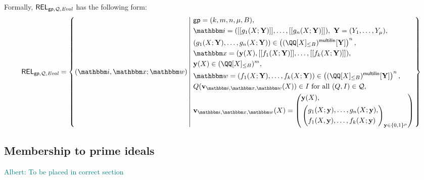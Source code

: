 \documentclass[11pt,letterpaper,usenames,dvipsnames]{article}
\newcommand{\albert}[1]{\textcolor{teal}{Albert: {#1}}}
\begin{document}
    Formally, $\mathsf{REL}_{\mathsf{gp},\mathcal{Q},\text{\emph{Eval}}}$ has the following form:
    \begin{equation*}
    \begin{aligned}
    \REL_{\gparams,\cQ,\evalconstraints} = \left\{ (\idx, \inp ; \wit) \left| \ \begin{aligned}
    & \gparams=(k,m,n,\mu, B),  \\
    & \idx = ( \oracle{g_1(X;\YY)},\ldots, \oracle{g_n(X;\YY)}), \ \YY=(Y_1,\ldots, Y_\mu), \\
            &(g_1(X;\YY),\dots,g_n(X;\YY))\in \left(\mainQpolyringmultilin[\YY]\right)^{n},\\
    & \inp =(\yy(X), \oracle{f_1(X;\YY)}, \ldots, \oracle{f_k(X;\YY)}),\\ &\yy(X)\in \mainQpolyring^{m},\\    
        &\wit = (f_1(X;\YY), \ldots, f_k(X;\YY)) \in \left(\mainQpolyringmultilin[\YY]\right)^{n},\\
        &Q(\vv_{\idx, \inp,\wit}(X)) \in I  \text{ for all } (Q,I)\in \cQ,\\
        &\vv_{\idx, \inp,\wit}(X) = \left(\begin{aligned}&\yy(X),\\ &\left(\begin{aligned}&g_1(X;\yy),\ldots, g_n(X;\yy),\\ &f_1(X,\yy),\ldots, f_k(X;\yy)\end{aligned}\right)_{\yy\in \BB^\mu}\end{aligned}\right)
    \end{aligned} \right.\right\}
    \end{aligned}
    \end{equation*}

    \subsection{Membership to prime ideals}
    \albert{To be placed in correct section}
\end{document}
